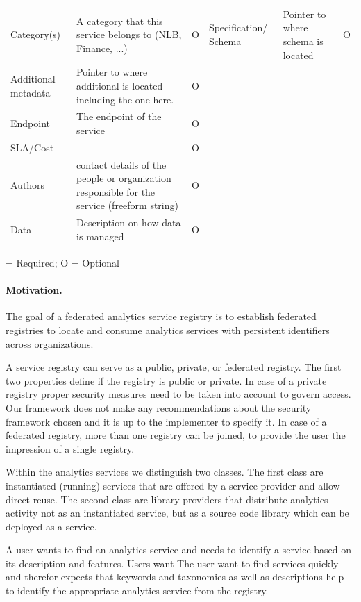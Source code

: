 \documentclass[12pt]{article}
\begin{document}
\begin{table}[htb]
\begin{tabular}{p{3cm}p{10cm}p{2cm}}
Category(s)	& A category that this service belongs to (NLB, Finance, ...)	& O & 
Specification/ Schema	& Pointer to where schema is located &	O \\
Additional metadata	& Pointer to where additional is located including the one here.	& O \\
Endpoint	& The endpoint of the service	& O \\
SLA/Cost	&	& O \\
Authors	& contact details of the people or organization responsible for the service (freeform string)	& O \\
Data	& Description on how data is managed	& O \\
\hline
\end{tabular}
\OK = Required; O = Optional
\end{table}



\paragraph{Motivation.} 
The goal of a federated analytics service registry is to establish federated registries to locate and consume analytics services with persistent identifiers across organizations. 

A service registry can serve as a public, private, or federated registry. The first two properties define if the registry is public or private. In case of a private registry proper security measures need to be taken into account to govern access. Our framework does not make any recommendations about the security framework chosen and it is up to the implementer to specify it. In case of a federated registry, more than one registry can be joined, to provide the user the impression of a single registry.

Within the analytics services we distinguish two classes. The first class are instantiated (running) services that are offered by a service provider and allow direct reuse. The second class are library providers that distribute analytics activity not as an instantiated service, but as a source code library which can be deployed as a service. 


A user wants to find an analytics service and needs to identify a service based on its description and features. Users want The user want to find services quickly and therefor expects that keywords and taxonomies as well as descriptions help to identify the appropriate analytics service from the registry.
\end{document}
